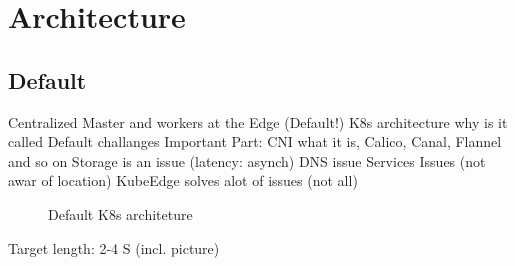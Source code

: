 \documentclass[MSC,Master,english]{twbook}%
\begin{document}
\section{Architecture}
\label{sec:architecture}
\subsection{Default}
Centralized Master and workers at the Edge (Default!) K8s architecture
why is it called Default
challanges
Important Part: \ac{CNI}
what it is, Calico, Canal, Flannel and so on
Storage is an issue (latency: asynch)
DNS issue
Services Issues (not awar of location)
KubeEdge solves alot of issues (not all)
\begin{figure}[h]
    \centering
    \caption{Default \ac{K8s} architeture}
    \label{fig:default-k8s}
\end{figure}


Target length: 2-4 S (incl. picture)
\end{document}
